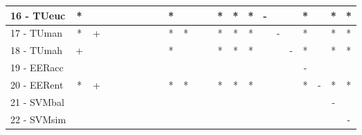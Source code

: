\begin{table}[h]
\begin{center}
\begin{tabular}{lcc|cc|cc|cc|cc|cc|cc|cc|cc|cc|cc}
16 - TUeuc	& * &   &   &   &   &   &   &   & * &   &   &   & * & * & * & - &   &   & * &   & * & * \\ \hline
17 - TUman	& * & + &   &   &   &   &   &   & * & * &   &   & * & * & * &   & - &   & * &   & * & * \\
18 - TUmah	& + &   &   &   &   &   &   &   & * &   &   &   & * & * & * &   &   & - & * &   & * & * \\ \hline
19 - EERacc	&   &   &   &   &   &   &   &   &   &   &   &   &   &   &   &   &   &   & - &   &   &   \\
20 - EERent	& * & + &   &   &   &   &   &   & * & * &   &   & * & * & * &   &   &   & * & - & * & * \\ \hline
21 - SVMbal	&   &   &   &   &   &   &   &   &   &   &   &   &   &   &   &   &   &   &   &   & - &   \\
22 - SVMsim	&   &   &   &   &   &   &   &   &   &   &   &   &   &   &   &   &   &   &   &   &   & - \\ \hline\end{tabular}

\label{stratsfried5NN}
\end{center}
\end{table}